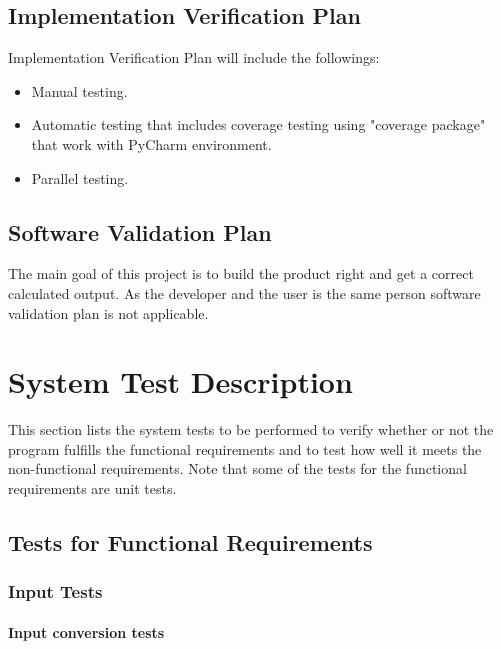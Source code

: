 \documentclass[12pt, titlepage]{article}
\begin{document}
\subsection{Implementation Verification Plan}

Implementation Verification Plan will include the followings:
\begin{itemize}
\item Manual testing.
\item  Automatic testing that includes coverage testing using "coverage package" that work with PyCharm environment.
\item Parallel testing. 
\end{itemize}

\subsection{Software Validation Plan}

The main goal of this project is to build the product right and get a correct calculated output. 
As the developer and the user is the same person software validation plan is not applicable.

\section{System Test Description}

This section lists the system tests to be performed to verify whether or not the
program fulfills the functional requirements and to test how well it meets the
non-functional requirements. Note that some of the tests for the functional
requirements are unit tests.

\subsection{Tests for Functional Requirements}


\subsubsection{Input Tests}

		
\paragraph{Input conversion tests}
\end{document}
